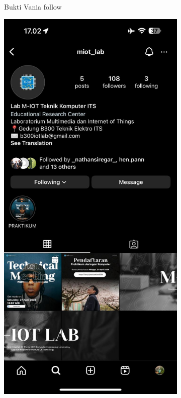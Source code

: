 \begin{enumerate}
\begin{figure}[H]
\begin{subfigure}{0.3\linewidth}
			\caption{Bukti Vania follow}
			\label{fig:gambar34}
		\end{subfigure}
		\begin{subfigure}{0.3\linewidth}
			\centering
			\includegraphics[width=\linewidth]{P1/img/cedfollow.jpg}

\end{subfigure}
\end{figure}
\end{enumerate}
